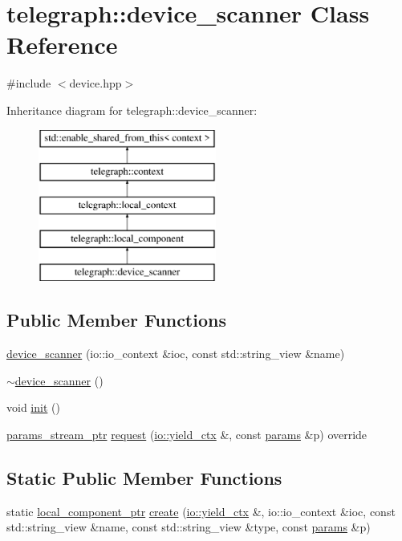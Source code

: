 \hypertarget{classtelegraph_1_1device__scanner}{}\section{telegraph\+:\+:device\+\_\+scanner Class Reference}
\label{classtelegraph_1_1device__scanner}


{\ttfamily \#include $<$device.\+hpp$>$}

Inheritance diagram for telegraph\+:\+:device\+\_\+scanner\+:\begin{figure}[H]
\begin{center}
\leavevmode
\includegraphics[height=5.000000cm]{classtelegraph_1_1device__scanner}
\end{center}
\end{figure}
\subsection*{Public Member Functions}
\begin{DoxyCompactItemize}
\item 
\hyperlink{classtelegraph_1_1device__scanner_a6e8057b68307b61500ed615248dcd730}{device\+\_\+scanner} (io\+::io\+\_\+context \&ioc, const std\+::string\+\_\+view \&name)
\item 
\hyperlink{classtelegraph_1_1device__scanner_a3d900bd95a620d086954562c669f91d9}{$\sim$device\+\_\+scanner} ()
\item 
void \hyperlink{classtelegraph_1_1device__scanner_a71be73d87ccb72b5311ad19aab16c1c7}{init} ()
\item 
\hyperlink{namespacetelegraph_ad071241508ea0f86c7de0686016f9ca9}{params\+\_\+stream\+\_\+ptr} \hyperlink{classtelegraph_1_1device__scanner_a5873278cb04e50896c3f125639df4c73}{request} (\hyperlink{structboost_1_1asio_1_1yield__ctx}{io\+::yield\+\_\+ctx} \&, const \hyperlink{classtelegraph_1_1params}{params} \&p) override
\end{DoxyCompactItemize}
\subsection*{Static Public Member Functions}
\begin{DoxyCompactItemize}
\item 
static \hyperlink{namespacetelegraph_a69cfb42be07c9189123cfa3ff3ec4487}{local\+\_\+component\+\_\+ptr} \hyperlink{classtelegraph_1_1device__scanner_a53b359ed0ed7088cdaf4d78658936a8d}{create} (\hyperlink{structboost_1_1asio_1_1yield__ctx}{io\+::yield\+\_\+ctx} \&, io\+::io\+\_\+context \&ioc, const std\+::string\+\_\+view \&name, const std\+::string\+\_\+view \&type, const \hyperlink{classtelegraph_1_1params}{params} \&p)
\end{DoxyCompactItemize}

